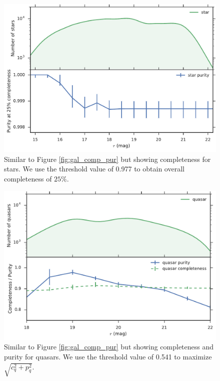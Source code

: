 \begin{figure}
  \centering
  \includegraphics[width=\columnwidth]{figures/star_comp_pur.pdf}
  \caption{
    Similar to Figure \ref{fig:gal_comp_pur} but showing completeness for stars.
    We use the threshold value of 0.977 to obtain overall completeness of $25\%$.
    }
  \label{fig:star_comp_pur}
\end{figure}

\begin{figure}
  \centering
  \includegraphics[width=\columnwidth]{figures/qso_comp_pur.pdf}
  \caption{
    Similar to Figure \ref{fig:gal_comp_pur} but showing completeness and purity for quasars.
    We use the threshold value of 0.541 to maximize $\sqrt{ c_q^2 + p_q^2 }$.
    }
  \label{fig:qso_comp_pur}
\end{figure}

